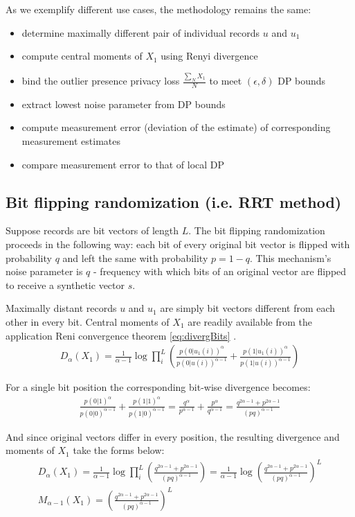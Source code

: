 \documentclass[11pt]{article}
\begin{document}
As we exemplify different use cases, the methodology remains the same:
\begin{itemize}
\item determine maximally different pair of individual records $u$ and $u_1$
\item compute central moments of $X_1$ using Renyi divergence
\item bind the outlier presence privacy loss $\frac{\sum_N X_1}{N}$ to meet $(\epsilon, \delta)$ DP bounds
\item extract lowest noise parameter from DP bounds
\item compute measurement error (deviation of the estimate) of corresponding measurement estimates
\item compare measurement error to that of local DP
\end{itemize} 

\subsection{Bit flipping randomization (i.e. RRT method)}
Suppose records are bit vectors of length $L$.  The bit flipping randomization proceeds in the following way: each bit of every original bit vector is flipped with probability $q$ and left the same with probability $p=1-q$.  This mechanism's  noise parameter is $q$ - frequency with which bits of an original vector are flipped to receive  a synthetic vector $s$.  

Maximally distant records $u$ and $u_1$ are simply bit vectors different from each other in every bit. Central moments of $X_1$ are readily available from the application Reni convergence theorem \eqref{eq:divergBits} .
  \begin{align*}
  D_{\alpha} (X_1) =   \frac{1}{\alpha - 1} \log \prod_{i}^L \left (  \frac{p(0|u_1(i))^{\alpha}}{ p(0|u(i))^{\alpha-1} } +   \frac{p(1|u_1(i))^{\alpha}}{ p(1|u(i))^{\alpha-1} } \right )
 \end{align*}

 For a single bit position the corresponding bit-wise divergence becomes:
 \begin{align*}
 \frac{p(0|1)^{\alpha}}{ p(0|0)^{\alpha-1} } +   \frac{p(1|1)^{\alpha}}{ p(1|0)^{\alpha-1} } =  \frac{q^{\alpha}}{ p^{\alpha-1} } +   \frac{p^{\alpha}}{ q^{\alpha-1} } = \frac{q^{2\alpha -1} + p^{2\alpha -1}}{ (pq)^{\alpha-1}}
 \end{align*}

 And since original vectors differ in every position, the resulting divergence and moments of $X_1$ take the forms below:
   \begin{align*}
  D_{\alpha} (X_1) =   \frac{1}{\alpha - 1} \log \prod_{i}^L \left (  \frac{q^{2\alpha -1} + p^{2\alpha -1}}{ (pq)^{\alpha-1}} \right ) =  \frac{1}{\alpha - 1} \log \left (  \frac{q^{2\alpha -1} + p^{2\alpha -1}}{ (pq)^{\alpha-1}} \right )^L  \\
  M_{\alpha-1} (X_1) =  \left (  \frac{q^{2\alpha -1} + p^{2\alpha -1}}{ (pq)^{\alpha-1}} \right )^L
 \end{align*}
\end{document}
